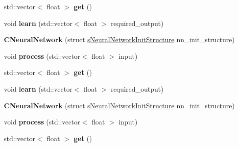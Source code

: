 \begin{DoxyCompactItemize}
\item 
\hypertarget{classCNeuralNetwork_aa9fe23130a9bb3b534a2e96fd07455c3}{std\-::vector$<$ float $>$ {\bfseries get} ()}\label{classCNeuralNetwork_aa9fe23130a9bb3b534a2e96fd07455c3}

\item 
\hypertarget{classCNeuralNetwork_a4926c2b280154a13ea49e3f4d0d26b00}{void {\bfseries learn} (std\-::vector$<$ float $>$ required\-\_\-output)}\label{classCNeuralNetwork_a4926c2b280154a13ea49e3f4d0d26b00}

\item 
\hypertarget{classCNeuralNetwork_af2f5f3147ed5c69c3b648347817dc8d1}{{\bfseries C\-Neural\-Network} (struct \hyperlink{structsNeuralNetworkInitStructure}{s\-Neural\-Network\-Init\-Structure} nn\-\_\-init\-\_\-structure)}\label{classCNeuralNetwork_af2f5f3147ed5c69c3b648347817dc8d1}

\item 
\hypertarget{classCNeuralNetwork_a5296b2830588ff8ca2570f18750536b7}{void {\bfseries process} (std\-::vector$<$ float $>$ input)}\label{classCNeuralNetwork_a5296b2830588ff8ca2570f18750536b7}

\item 
\hypertarget{classCNeuralNetwork_aa9fe23130a9bb3b534a2e96fd07455c3}{std\-::vector$<$ float $>$ {\bfseries get} ()}\label{classCNeuralNetwork_aa9fe23130a9bb3b534a2e96fd07455c3}

\item 
\hypertarget{classCNeuralNetwork_a4926c2b280154a13ea49e3f4d0d26b00}{void {\bfseries learn} (std\-::vector$<$ float $>$ required\-\_\-output)}\label{classCNeuralNetwork_a4926c2b280154a13ea49e3f4d0d26b00}

\item 
\hypertarget{classCNeuralNetwork_af2f5f3147ed5c69c3b648347817dc8d1}{{\bfseries C\-Neural\-Network} (struct \hyperlink{structsNeuralNetworkInitStructure}{s\-Neural\-Network\-Init\-Structure} nn\-\_\-init\-\_\-structure)}\label{classCNeuralNetwork_af2f5f3147ed5c69c3b648347817dc8d1}

\item 
\hypertarget{classCNeuralNetwork_a5296b2830588ff8ca2570f18750536b7}{void {\bfseries process} (std\-::vector$<$ float $>$ input)}\label{classCNeuralNetwork_a5296b2830588ff8ca2570f18750536b7}

\item 
\hypertarget{classCNeuralNetwork_aa9fe23130a9bb3b534a2e96fd07455c3}{std\-::vector$<$ float $>$ {\bfseries get} ()}\label{classCNeuralNetwork_aa9fe23130a9bb3b534a2e96fd07455c3}


\end{DoxyCompactItemize}
